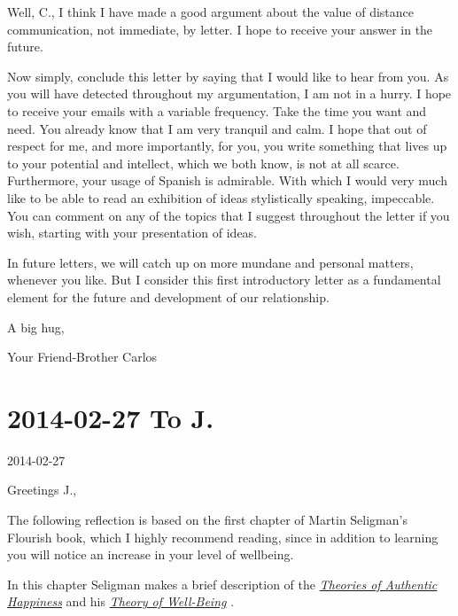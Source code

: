 \documentclass[]{book}
\begin{document}
Well, C., I think I have made a good argument about the value of distance communication, not immediate, by letter. I hope to receive your answer in the future.

Now simply, conclude this letter by saying that I would like to hear from you. As you will have detected throughout my argumentation, I am not in a hurry. I hope to receive your emails with a variable frequency. Take the time you want and need. You already know that I am very tranquil and calm. I hope that out of respect for me, and more importantly, for you, you write something that lives up to your potential and intellect, which we both know, is not at all scarce. Furthermore, your usage of Spanish is admirable. With which I would very much like to be able to read an exhibition of ideas stylistically speaking, impeccable. You can comment on any of the topics that I suggest throughout the letter if you wish, starting with your presentation of ideas.

In future letters, we will catch up on more mundane and personal matters, whenever you like. But I consider this first introductory letter as a fundamental element for the future and development of our relationship.

A big hug,

Your Friend-Brother Carlos

\hypertarget{toJ20140227}{%
\section*{2014-02-27 To J.}\label{toJ20140227}}

2014-02-27

Greetings J.,

The following reflection is based on the first chapter of Martin Seligman's Flourish book, which I highly recommend reading, since in addition to learning you will notice an increase in your level of wellbeing.

In this chapter Seligman makes a brief description of the \href{http://www.amazon.com/Authentic-Happiness-Psychology-Potential-Fulfillment/dp/0743222989/ref=sr_1_1?ie=UTF8\&qid=1381506809\&sr=8-1\&keywords=authentic\%20happiness}{\emph{Theories of Authentic Happiness}} \citep{seligman2004authentic} and his \href{https://www.amazon.com/Flourish-Visionary-Understanding-Happiness-Well-being/dp/1439190763/ref=sr_1_1?ie=UTF8\&qid=1381506783\&sr=8-1\&keywords=flourish}{\emph{Theory of Well-Being}} \citep{seligman2012flourish}.
\end{document}
